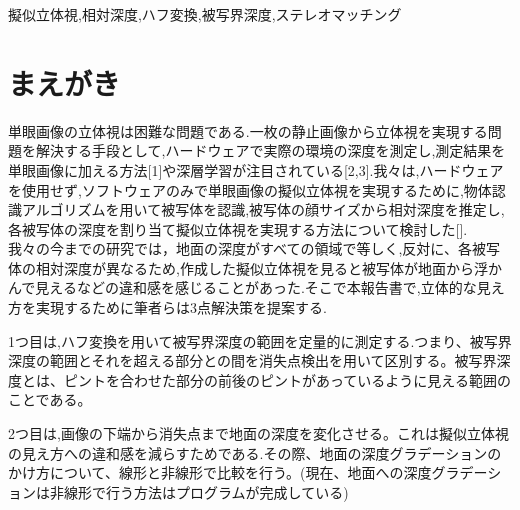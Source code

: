 \documentclass[technicalreport]{ieicej}
\begin{document}
\begin{jkeyword}
擬似立体視,相対深度,ハフ変換,被写界深度,ステレオマッチング
\end{jkeyword}

\maketitle

\section{まえがき}
単眼画像の立体視は困難な問題である.一枚の静止画像から立体視を実現する問題を解決する手段として,ハードウェアで実際の環境の深度を測定し,測定結果を単眼画像に加える方法[1]や深層学習が注目されている[2,3].我々は,ハードウェアを使用せず,ソフトウェアのみで単眼画像の擬似立体視を実現するために,物体認識アルゴリズムを用いて被写体を認識,被写体の顔サイズから相対深度を推定し,各被写体の深度を割り当て擬似立体視を実現する方法について検討した[].\\

我々の今までの研究では，地面の深度がすべての領域で等しく,反対に、各被写体の相対深度が異なるため,作成した擬似立体視を見ると被写体が地面から浮かんで見えるなどの違和感を感じることがあった.そこで本報告書で,立体的な見え方を実現するために筆者らは3点解決策を提案する.

1つ目は,ハフ変換を用いて被写界深度の範囲を定量的に測定する.つまり、被写界深度の範囲とそれを超える部分との間を消失点検出を用いて区別する。被写界深度とは、ピントを合わせた部分の前後のピントがあっているように見える範囲のことである。



2つ目は,画像の下端から消失点まで地面の深度を変化させる。これは擬似立体視の見え方への違和感を減らすためである.その際、地面の深度グラデーションのかけ方について、線形と非線形で比較を行う。(現在、地面への深度グラデーションは非線形で行う方法はプログラムが完成している)
\end{document}
